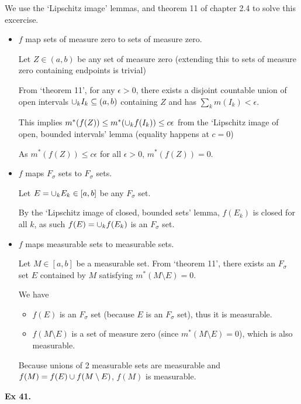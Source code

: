 \noindent We use the `Lipschitz image' lemmas, and theorem 11 of chapter 2.4 to solve this excercise.
\begin{itemize}
    \item $f$ map sets of measure zero to sets of measure zero.

    Let $Z \in (a,b)$ be any set of measure zero (extending this to sets of measure zero containing endpoints is trivial)


    From `theorem 11', for any $\epsilon > 0$, there exists a disjoint countable union of open intervals $\cup_k I_k \subseteq (a,b)$ containing $Z$ and has $ \sum_k m(I_k) < \epsilon$.
    
    This implies $m^\ast(f(Z)) \leq m^\ast(\cup_k f(I_k)) \leq c\epsilon$ from the `Lipschitz image of open, bounded intervals' lemma (equality happens at $c=0$)

    As $m^\ast(f(Z)) \leq c\epsilon$ for all $\epsilon > 0$, $m^\ast(f(Z)) = 0$.

    \item $f$ maps $F_\sigma$ sets to $F_\sigma$ sets.
    
    Let $E = \cup_k E_k \in [a,b]$ be any $F_\sigma$ set.

    By the `Lipschitz image of closed, bounded sets' lemma, $f(E_k)$ is closed for all $k$, as such $f(E) = \cup_k f(E_k)$ is an $F_\sigma$ set.

    \item $f$ maps measurable sets to measurable sets.
    
    Let $M \in [a,b]$ be a measurable set. From `theorem 11', there exists an $F_\sigma$ set $E$ contained by $M$ satisfying $m^\ast(M \setminus E) = 0$.

    We have
    \begin{itemize}
        \item[] $f(E)$ is an $F_\sigma$ set (because $E$ is an $F_\sigma$ set), thus it is measurable.
        \item[] $f(M\setminus E)$ is a set of measure zero (since $m^\ast(M\setminus E) = 0$), which is also measurable.
    \end{itemize}
    Because unions of 2 measurable sets are measurable and $f(M) = f(E) \cup f(M\setminus E)$, $f(M)$ is measurable.
\end{itemize}


\noindent {} \textbf{Ex 41.} \label{ex:2_41}

